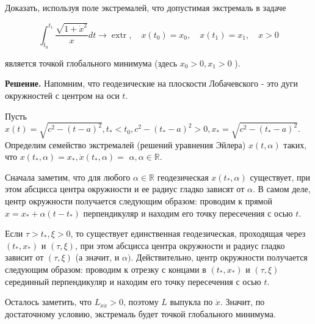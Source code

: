 \begin{task}
Доказать, используя поле экстремалей, что допустимая экстремаль в задаче

$$
\int_{t_{0}}^{t_{1}} \frac{\sqrt{1+\dot{x}^{2}}}{x} d t \rightarrow \operatorname{extr}, \quad x\left(t_{0}\right)=x_{0}, \quad x\left(t_{1}\right)=x_{1}, \quad x>0
$$

является точкой глобального минимума (здесь $x_{0}>0, x_{1}>0$ ).

\textbf{Решение.} Напомним, что геодезические на плоскости Лобачевского - это дуги окружностей с центром на оси $t$.

Пусть $\hat{x}(t)=\sqrt{c^{2}-(t-a)^{2}}, t_{*}<t_{0}, c^{2}-\left(t_{*}-a\right)^{2}>0, x_{*}=\sqrt{c^{2}-\left(t_{*}-a\right)^{2}}$. Определим семейство экстремалей (решений уравнения Эйлера) $x(t, \alpha)$ таких, что $x\left(t_{*}, \alpha\right)=x_{*}, \dot{x}\left(t_{*}, \alpha\right)=$ $\alpha, \alpha \in \mathbb{R}$.

Сначала заметим, что для любого $\alpha \in \mathbb{R}$ геодезическая $x\left(t_{*}, \alpha\right)$ существует, при этом абсцисса центра окружности и ее радиус гладко зависят от $\alpha$. В самом деле, центр окружности получается следующим образом: проводим к прямой $x=x_{*}+\alpha\left(t-t_{*}\right)$ перпендикуляр и находим его точку пересечения с осью $t$.

Если $\tau>t_{*}, \xi>0$, то существует единственная геодезическая, проходящая через $\left(t_{*}, x_{*}\right)$ и $(\tau, \xi)$, при этом абсцисса центра окружности и радиус гладко зависит от $(\tau, \xi)$ (а значит, и $\alpha)$. Действительно, центр окружности получается следующим образом: проводим к отрезку с концами в $\left(t_{*}, x_{*}\right)$ и $(\tau, \xi)$ серединный перпендикуляр и находим его точку пересечения с осью $t$.

Осталось заметить, что $L_{\dot{x} \dot{x}}>0$, поэтому $L$ выпукла по $\dot{x}$. Значит, по достаточному условию, экстремаль будет точкой глобального минимума.
\end{task}